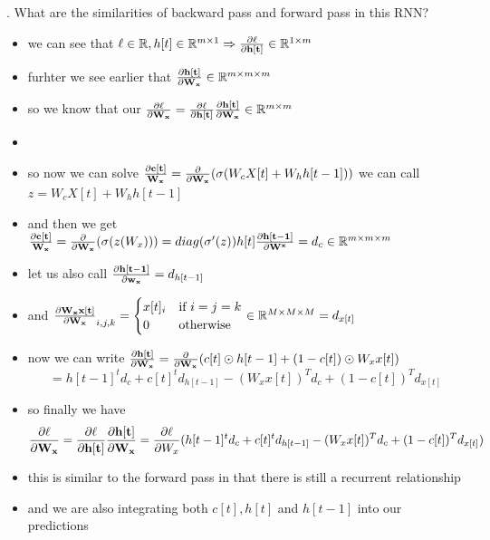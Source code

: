 \documentclass{article}
\begin{document}
\begin{enumerate}[(a)]
    . What are the similarities of backward pass
    and forward pass in this RNN?
    \begin{itemize}
        \color{red}
        \item we can see that $\ell \in \mathbb{R}, h[t]\in \mathbb{R}^{m\times 1}\Rightarrow\frac{\partial \ell}{\partial \bold{h[t]}}\in \mathbb{R}^{1\times m}$
        \item furhter we see earlier that $\frac{\partial \bold{h[t]}}{\partial \bold{W_x}}\in \mathbb{R}^{m\times m \times m}$
        \item so we know that our $\frac{\partial \ell}{\partial \bold{W_x}}=\frac{\partial \ell}{\partial \bold{h[t]}}\frac{\partial \bold{h[t]}}{\partial \bold{W_x}}\in \mathbb{R}^{m \times m}$
        \item 
        \item so now we can solve $\frac{\partial \bold{c[t]}}{\bold{W_x}}=\frac{\partial }{\partial \bold{W_x}}(\sigma(W_cX[t]+W_hh[t-1]))$ we can call $z=W_cX[t]+W_hh[t-1]$ 
        \item and then we get $\frac{\partial \bold{c[t]}}{\bold{W_x}}=\frac{\partial }{\partial \bold{W_x}}(\sigma(z(W_x)))=diag(\sigma'(z))h[t]\frac{\partial \bold{h[t-1]}}{\partial \bold{W^x}}=d_c\in \mathbb{R}^{m\times m\times m}$
        \item let us also call $\frac{\partial \bold{h[t-1]}}{\partial \bold{w_x}}=d_{h[t-1]}$
        \item and $\frac{\partial \bold{W_xx[t]}}{\partial \bold{W_x}}_{i,j,k}=\begin{cases}
            x[t]_{i} & \text{if } i=j=k\\
            0 & \text{otherwise}
        \end{cases}\in \mathbb{R}^{M\times M\times M} = d_{x[t]}$
        \item now we can write $\frac{\partial \bold{h[t]}}{\partial \bold{W_x}}=\frac{\partial }{\partial \bold{W_x}}(c[t]\odot h[t-1]+(1-c[t])\odot W_xx[t])
        $ $$=h[t-1]^{t}d_c+c[t]^{t}d_{h[t-1]}-(W_xx[t])^{T}d_c+(1-c[t])^{T}d_{x[t]}$$
        \item so finally we have $$\frac{\partial \ell}{\partial \bold{W_x}}=\frac{\partial \ell}{\partial \bold{h[t]}}\frac{\partial \bold{h[t]}}{\partial \bold{W_x}}=\frac{\partial \ell}{\partial W_x}(h[t-1]^{t}d_c+c[t]^{t}d_{h[t-1]}-(W_xx[t])^{T}d_c+(1-c[t])^{T}d_{x[t]})$$
        \item this is similar to the forward pass in that there is still a recurrent relationship
        \item and we are also integrating both $c[t], h[t]$ and $h[t-1]$ into our predictions 
        







\end{itemize}
\end{enumerate}
\end{document}
